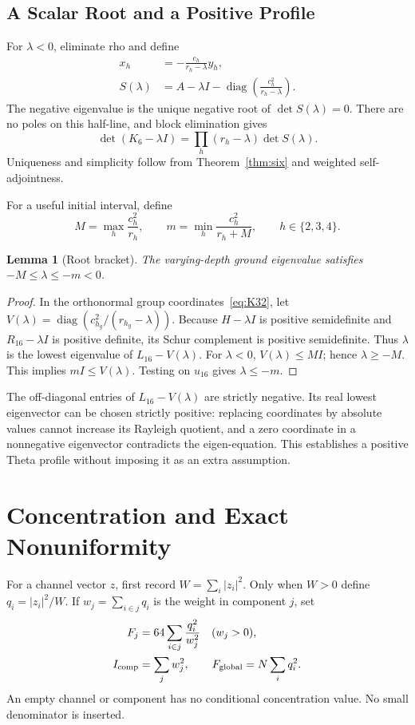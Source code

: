 \documentclass[journal,a4paper,10pt]{IEEEtran}
\newtheorem{lemma}[theorem]{Lemma}
\theoremstyle{definition}\newtheorem{definition}[theorem]{Definition}
\theoremstyle{remark}\newtheorem{remark}[theorem]{Remark}
\newcommand{\diag}{\operatorname{diag}}
\begin{document}
\subsection{A Scalar Root and a Positive Profile}
For $\lambda<0$, eliminate rho and define
\begin{align}
x_h&=-\frac{c_h}{r_h-\lambda}y_h,\label{eq:eliminate}\\
S(\lambda)&=A-\lambda I-
\diag\left(\frac{c_h^2}{r_h-\lambda}\right).\label{eq:schur}
\end{align}
The negative eigenvalue is the unique negative root of $\det S(\lambda)=0$. There are no poles on this half-line, and block elimination gives
\begin{equation}
\det(K_6-\lambda I)=\prod_h(r_h-\lambda)\det S(\lambda).
\end{equation}
Uniqueness and simplicity follow from Theorem~\ref{thm:six} and weighted self-adjointness.

For a useful initial interval, define
\begin{equation}\label{eq:Mm}
M=\max_h\frac{c_h^2}{r_h},\qquad
m=\min_h\frac{c_h^2}{r_h+M},\qquad h\in\{2,3,4\}.
\end{equation}
\begin{lemma}[Root bracket]\label{lem:bracket}
The varying-depth ground eigenvalue satisfies $-M\leq\lambda\leq-m<0$.
\end{lemma}
\begin{proof}
In the orthonormal group coordinates~\eqref{eq:K32}, let
$V(\lambda)=\diag(c_{h_g}^2/(r_{h_g}-\lambda))$.
Because $H-\lambda I$ is positive semidefinite and $R_{16}-\lambda I$ is positive definite, its Schur complement is positive semidefinite. Thus $\lambda$ is the lowest eigenvalue of $L_{16}-V(\lambda)$. For $\lambda<0$, $V(\lambda)\leq MI$; hence $\lambda\geq-M$. This implies $mI\leq V(\lambda)$. Testing on $u_{16}$ gives $\lambda\leq-m$.
\end{proof}
The off-diagonal entries of $L_{16}-V(\lambda)$ are strictly negative. Its real lowest eigenvector can be chosen strictly positive: replacing coordinates by absolute values cannot increase its Rayleigh quotient, and a zero coordinate in a nonnegative eigenvector contradicts the eigen-equation. This establishes a positive Theta profile without imposing it as an extra assumption.

\section{Concentration and Exact Nonuniformity}\label{sec:concentration}
For a channel vector $z$, first record $W=\sum_i|z_i|^2$. Only when $W>0$ define $q_i=|z_i|^2/W$. If $w_j=\sum_{i\in j}q_i$ is the weight in component $j$, set
\begin{align}
F_j&=64\sum_{i\in j}\frac{q_i^2}{w_j^2}\quad(w_j>0),\label{eq:Fc}\\
I_{\rm comp}&=\sum_jw_j^2,\qquad F_{\rm global}=N\sum_iq_i^2.\nonumber
\end{align}
An empty channel or component has no conditional concentration value. No small denominator is inserted.
\end{document}

